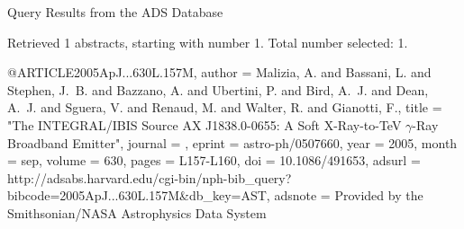 Query Results from the ADS Database


Retrieved 1 abstracts, starting with number 1.  Total number selected: 1.

@ARTICLE{2005ApJ...630L.157M,
   author = {{Malizia}, A. and {Bassani}, L. and {Stephen}, J.~B. and {Bazzano}, A. and 
	{Ubertini}, P. and {Bird}, A.~J. and {Dean}, A.~J. and {Sguera}, V. and 
	{Renaud}, M. and {Walter}, R. and {Gianotti}, F.},
    title = "{The INTEGRAL/IBIS Source AX J1838.0-0655: A Soft X-Ray-to-TeV {$\gamma$}-Ray Broadband Emitter}",
  journal = {\apjl},
   eprint = {astro-ph/0507660},
     year = 2005,
    month = sep,
   volume = 630,
    pages = {L157-L160},
      doi = {10.1086/491653},
   adsurl = {http://adsabs.harvard.edu/cgi-bin/nph-bib_query?bibcode=2005ApJ...630L.157M&db_key=AST},
  adsnote = {Provided by the Smithsonian/NASA Astrophysics Data System}
}


